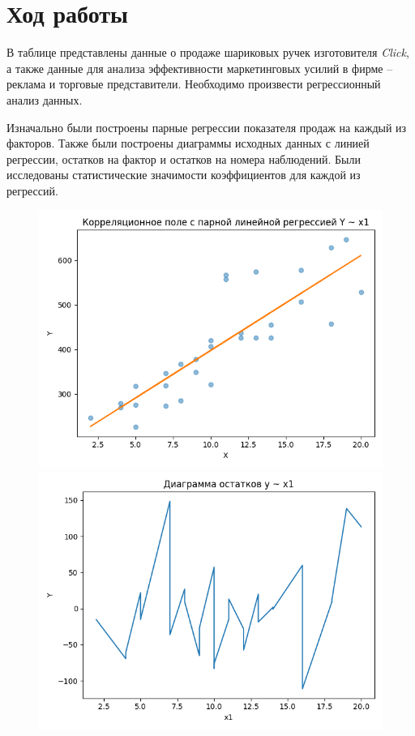 \section{Ход работы}

В таблице представлены данные о продаже шариковых ручек изготовителя \textit{Click}, а также данные для анализа эффективности маркетинговых усилий в фирме -- реклама и торговые представители. Необходимо произвести регрессионный анализ данных.

Изначально были построены парные регрессии показателя продаж на каждый из факторов. Также были построены диаграммы исходных данных с линией регрессии, остатков на фактор и остатков на номера наблюдений. Были исследованы статистические значимости коэффициентов для каждой из регрессий.

\begin{figure}[H]
	\begin{minipage}[H]{0.32\linewidth}
		\begin{center}
			\includegraphics[width=\linewidth]{figures/lin_reg_y_x1}
		\end{center}
	\end{minipage}
	\hfill
	\begin{minipage}[H]{0.32\linewidth}
		\begin{center}
			\includegraphics[width=\linewidth]{figures/res_plot_x1}

\end{center}
\end{minipage}
\end{figure}
